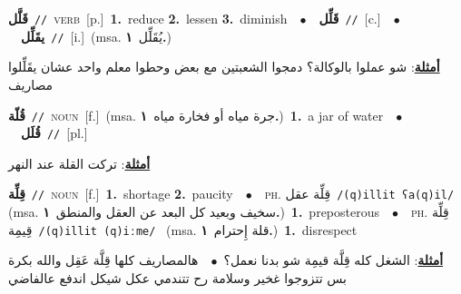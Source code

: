 \documentclass[10pt,a4paper,twoside]{article} %
\begin{document}
\begin{multicols}{2}
{\setlength\topsep{0pt}\textbf{\foreignlanguage{arabic}{قَلَّل}}\ {\color{gray}\texttt{//}\color{black}}\ \textsc{verb}\ [p.]\ \textbf{1.}~reduce  \textbf{2.}~lessen  \textbf{3.}~diminish\ \ $\bullet$\ \ \setlength\topsep{0pt}\textbf{\foreignlanguage{arabic}{قَلِّل}}\ {\color{gray}\texttt{//}\color{black}}\ [c.]\ \ $\bullet$\ \ \setlength\topsep{0pt}\textbf{\foreignlanguage{arabic}{يقَلِّل}}\ {\color{gray}\texttt{//}\color{black}}\ [i.]\ \color{gray}(msa. \foreignlanguage{arabic}{يُقَلِّل}~\foreignlanguage{arabic}{\textbf{١.}})\color{black}\  \begin{flushright}\color{gray}\foreignlanguage{arabic}{\textbf{\underline{\foreignlanguage{arabic}{أمثلة}}}: شو عملوا بالوكالة؟ دمجوا الشعبتين مع بعض وحطوا معلم واحد عشان يقَلِّلوا مصاريف}\end{flushright}\color{black}} \vspace{2mm}

{\setlength\topsep{0pt}\textbf{\foreignlanguage{arabic}{قُلّة}}\ {\color{gray}\texttt{//}\color{black}}\ \textsc{noun}\ [f.]\ \color{gray}(msa. \foreignlanguage{arabic}{جرة مياه أو فخارة مياه}~\foreignlanguage{arabic}{\textbf{١.}})\color{black}\ \textbf{1.}~a jar of water\ \ $\bullet$\ \ \setlength\topsep{0pt}\textbf{\foreignlanguage{arabic}{قُلَل}}\ {\color{gray}\texttt{//}\color{black}}\ [pl.]\  \begin{flushright}\color{gray}\foreignlanguage{arabic}{\textbf{\underline{\foreignlanguage{arabic}{أمثلة}}}: تركت القلة عند النهر}\end{flushright}\color{black}} \vspace{2mm}

{\setlength\topsep{0pt}\textbf{\foreignlanguage{arabic}{قِلِّة}}\ {\color{gray}\texttt{//}\color{black}}\ \textsc{noun}\ [f.]\ \textbf{1.}~shortage  \textbf{2.}~paucity\ \ $\bullet$\ \ \textsc{ph.} \color{gray} \foreignlanguage{arabic}{قِلِّة عقل}\color{black}\ {\color{gray}\texttt{/{\sffamily (q)illit ʕa(q)il}/}\color{black}}\ \color{gray} (msa. \foreignlanguage{arabic}{سخيف وبعيد كل البعد عن العقل والمنطق}~\foreignlanguage{arabic}{\textbf{١.}})\color{black}\ \textbf{1.}~preposterous\ \ $\bullet$\ \ \textsc{ph.} \color{gray} \foreignlanguage{arabic}{قِلِّة قِيمِة}\color{black}\ {\color{gray}\texttt{/{\sffamily (q)illit (q)iːme}/}\color{black}}\ \color{gray} (msa. \foreignlanguage{arabic}{قلة إِحترام}~\foreignlanguage{arabic}{\textbf{١.}})\color{black}\ \textbf{1.}~disrespect\  \begin{flushright}\color{gray}\foreignlanguage{arabic}{\textbf{\underline{\foreignlanguage{arabic}{أمثلة}}}: الشغل كله قِلَّة قيمِة شو بدنا نعمل؟\ $\bullet$\ \  هالمصاريف كلها قِلَّة عَقِل والله بكرة بس تتزوجوا غخير وسلامة رح تتندمي عكل شيكل اندفع عالفاضي}\end{flushright}\color{black}} \vspace{2mm}


\end{multicols}
\end{document}
